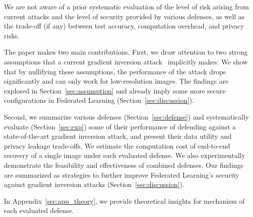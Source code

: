 We are not aware of a prior systematic evaluation of the level of risk arising from current attacks and the level of security provided by various defenses, as well as the trade-off (if any) between test accuracy, computation overhead, and privacy risks.

The paper makes two main contributions. First, we draw attention to two strong assumptions that a current gradient inversion attack~\citep{geiping2020inverting} implicitly makes. We show that by nullifying these assumptions, the performance of the attack drops significantly and can only work for low-resolution images. 
The findings are explored in  Section~\ref{sec:assumption} and already imply some more secure configurations in Federated Learning (Section~\ref{sec:discussion}).


Second, we summarize various defenses (Section~\ref{sec:defense}) and systematically evaluate (Section~\ref{sec:exp}) some of their performance of defending against a state-of-the-art gradient inversion attack, and present their data utility and privacy leakage trade-offs. We estimate the computation cost of end-to-end recovery of a single image under each evaluated defense. We also experimentally demonstrate the feasibility and effectiveness of combined defenses. Our findings are summarized as strategies to further improve Federated Learning's security against gradient inversion attacks (Section~\ref{sec:discussion}).

In Appendix~\ref{sec:app_theory}, we provide theoretical insights for mechanism of each evaluated defense. 

